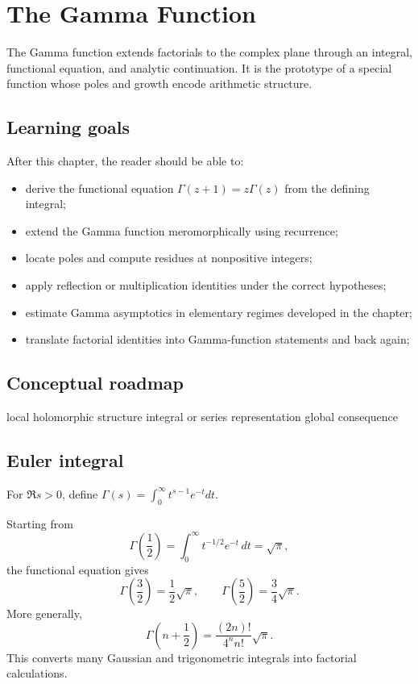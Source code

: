 \chapter{The Gamma Function}
\label{ch:iv19}

The Gamma function extends factorials to the complex plane through an integral, functional equation, and analytic continuation. It is the prototype of a special function whose poles and growth encode arithmetic structure.

\section*{Learning goals}
After this chapter, the reader should be able to:
\begin{itemize}
\item derive the functional equation \(\Gamma(z+1)=z\Gamma(z)\) from the defining integral;
\item extend the Gamma function meromorphically using recurrence;
\item locate poles and compute residues at nonpositive integers;
\item apply reflection or multiplication identities under the correct hypotheses;
\item estimate Gamma asymptotics in elementary regimes developed in the chapter;
\item translate factorial identities into Gamma-function statements and back again;
\end{itemize}
\section*{Conceptual roadmap}
\volroadmap
  {local holomorphic structure}
  {integral or series representation}
  {global consequence}

\section{Euler integral}
For $\Re s>0$, define $\Gamma(s)=\int_0^\infty t^{s-1}e^{-t}dt$.

\begin{example}\label{ex:iv19-expand-01}
Starting from
\[
\Gamma\!\left(\frac12\right)=\int_0^\infty t^{-1/2}e^{-t}\,dt=\sqrt{\pi},
\]
the functional equation gives
\[
\Gamma\!\left(\frac32\right)=\frac12\sqrt{\pi},\qquad
\Gamma\!\left(\frac52\right)=\frac34\sqrt{\pi}.
\]
More generally,
\[
\Gamma\!\left(n+\frac12\right)=\frac{(2n)!}{4^n n!}\sqrt{\pi}.
\]
This converts many Gaussian and trigonometric integrals into factorial calculations.
\end{example}
